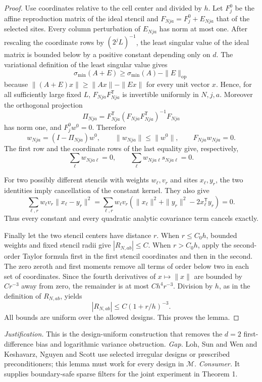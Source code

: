 \documentclass{article}
\begin{document}
\begin{proof}
Use coordinates relative to the cell center and divided by \(h\).  Let \(F^0_j\) be the affine reproduction matrix of the ideal stencil and \(F_{Nja}=F^0_j+E_{Nja}\) that of the selected sites.  Every column perturbation of \(E_{Nja}\) has norm at most one.  After rescaling the coordinate rows by \((2^jL)^{-1}\), the least singular value of the ideal matrix is bounded below by a positive constant depending only on \(d\).  The variational definition of the least singular value gives
\[
 \sigma_{\min}(A+E)\ge \sigma_{\min}(A)-\|E\|_{\mathrm{op}}
\]
because \(\|(A+E)x\|\ge\|Ax\|-\|Ex\|\) for every unit vector \(x\).  Hence, for all sufficiently large fixed \(L\), \(F_{Nja}F_{Nja}^{\mathsf T}\) is invertible uniformly in \(N,j,a\).  Moreover the orthogonal projection
\[
 \Pi_{Nja}=F_{Nja}^{\mathsf T}(F_{Nja}F_{Nja}^{\mathsf T})^{-1}F_{Nja}
\]
has norm one, and \(F^0_jw^0=0\).  Therefore
\[
 w_{Nja}=(I-\Pi_{Nja})w^0,
 \qquad \|w_{Nja}\|\le \|w^0\|,
 \qquad F_{Nja}w_{Nja}=0.
\]
The first row and the coordinate rows of the last equality give, respectively,
\[
 \sum_\ell w_{Nja\ell}=0,
 \qquad
 \sum_\ell w_{Nja\ell}s_{Nja\ell}=0.
\]

For two possibly different stencils with weights \(w_\ell,v_r\) and sites \(x_\ell,y_r\), the two identities imply cancellation of the constant kernel.  They also give
\[
 \sum_{\ell,r}w_\ell v_r\|x_\ell-y_r\|^2
 =\sum_{\ell,r}w_\ell v_r
   (\|x_\ell\|^2+\|y_r\|^2-2x_\ell^{\mathsf T}y_r)=0.
\]
Thus every constant and every quadratic analytic covariance term cancels exactly.

Finally let the two stencil centers have distance \(r\).  When \(r\le C_0h\), bounded weights and fixed stencil radii give \(|R_{N,ab}|\le C\).  When \(r>C_0h\), apply the second-order Taylor formula first in the first stencil coordinates and then in the second.  The zero zeroth and first moments remove all terms of order below two in each set of coordinates.  Since the fourth derivatives of \(x\mapsto\|x\|\) are bounded by \(Cr^{-3}\) away from zero, the remainder is at most \(Ch^4r^{-3}\).  Division by \(h\), as in the definition of \(R_{N,ab}\), yields
\[
 |R_{N,ab}|\le C(1+r/h)^{-3}.
\]
All bounds are uniform over the allowed designs.  This proves the lemma.
\end{proof}
\par\smallskip\noindent \textit{Justification.} This is the design-uniform construction that removes the \(d=2\) first-difference bias and logarithmic variance obstruction. \textit{Gap.} Loh, Sun and Wen and Keshavarz, Nguyen and Scott use selected irregular designs or prescribed preconditioners; this lemma must work for every design in \(\mathcal M\). \textit{Consumer.} It supplies boundary-safe sparse filters for the joint experiment in Theorem 1.
\end{document}
